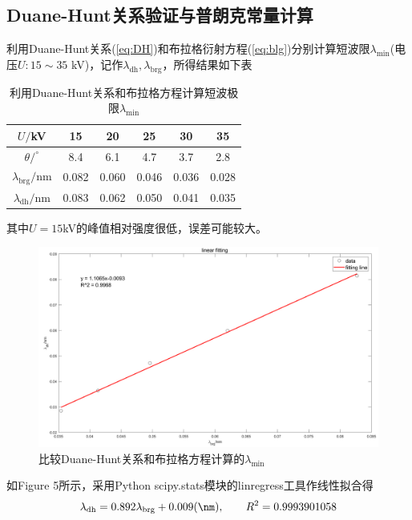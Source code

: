 \documentclass[10.5pt]{article}
\renewcommand{\=}[1]{\stackrel{#1}{=}} %
\theoremstyle{definition}
\theoremstyle{remark}
\begin{document}
	\subsection{Duane-Hunt关系验证与普朗克常量计算}
	利用Duane-Hunt关系(\ref{eq:DH})和布拉格衍射方程(\ref{eq:blg})分别计算短波限$\lambda_{\min}$(电压$U:15\sim35$ kV)，记作$\lambda_{\text{dh}},\lambda_{\text{brg}}$，所得结果如下表
	\begin{table}[htbp]
		\centering
		\caption{利用Duane-Hunt关系和布拉格方程计算短波极限$\lambda_{\min}$}
		\begin{tabular}{|c|c|c|c|c|c|}
			\hline
			$U/$kV  & 15    & 20    & 25    & 30    & 35 \bigstrut\\
			\hline
			$\theta/^\circ$     & 8.4   & 6.1   & 4.7   & 3.7   & 2.8 \bigstrut\\
			\hline
			$\lambda_{\text{brg}}/$nm   & 0.082  & 0.060  & 0.046  & 0.036  & 0.028  \bigstrut\\
			\hline
			$\lambda_{\text{dh}}/$nm    & 0.083  & 0.062  & 0.050  & 0.041  & 0.035  \bigstrut\\
			\hline
		\end{tabular}%
	\end{table}%
	其中$U=15 $kV的峰值相对强度很低，误差可能较大。\\
	\begin{figure}[H]
		\centering
		\includegraphics[scale=0.5]{dh_brg.png}
		\captionsetup{font=footnotesize}
		\caption{比较Duane-Hunt关系和布拉格方程计算的$\lambda_{\min}$}
	\end{figure}
	
	如Figure 5所示，采用Python scipy.stats模块的linregress工具作线性拟合得
	\begin{equation}\label{eq:fitting_dh}
		\lambda_{\text{dh}}=0.892\lambda_{\text{brg}}+0.009(\nm),\qquad R^2=0.9993901058
	\end{equation}
	
\end{document}
